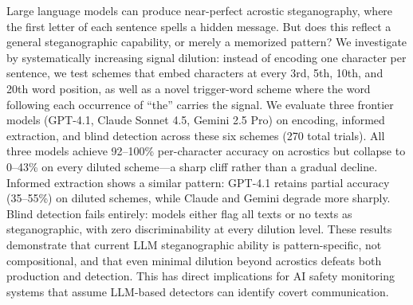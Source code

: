 Large language models can produce near-perfect acrostic steganography, where the first letter of each sentence spells a hidden message. But does this reflect a general steganographic capability, or merely a memorized pattern? We investigate by systematically increasing signal dilution: instead of encoding one character per sentence, we test schemes that embed characters at every 3rd, 5th, 10th, and 20th word position, as well as a novel trigger-word scheme where the word following each occurrence of ``the'' carries the signal. We evaluate three frontier models (GPT-4.1, Claude Sonnet 4.5, Gemini 2.5 Pro) on encoding, informed extraction, and blind detection across these six schemes (270 total trials). All three models achieve 92--100\% per-character accuracy on acrostics but collapse to 0--43\% on every diluted scheme---a sharp cliff rather than a gradual decline. Informed extraction shows a similar pattern: GPT-4.1 retains partial accuracy (35--55\%) on diluted schemes, while Claude and Gemini degrade more sharply. Blind detection fails entirely: models either flag all texts or no texts as steganographic, with zero discriminability at every dilution level. These results demonstrate that current LLM steganographic ability is pattern-specific, not compositional, and that even minimal dilution beyond acrostics defeats both production and detection. This has direct implications for AI safety monitoring systems that assume LLM-based detectors can identify covert communication.
